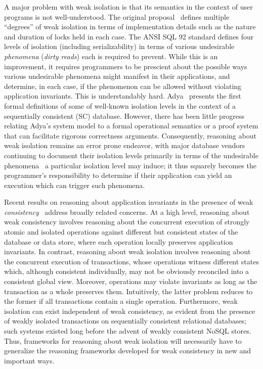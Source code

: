 A major problem with weak isolation is that its semantics in the
context of user programs is not well-understood. The original
proposal~\cite{gray1976} defines multiple ``degrees'' of weak
isolation in terms of implementation details such as the nature and
duration of locks held in each case. The ANSI SQL 92 standard defines
four levels of isolation (including serializability) in terms of
various undesirable \emph{phenomena} (\eg \emph{dirty reads}) each is
required to prevent. While this is an improvement, it requires
programmers to be prescient about the possible ways various
undesirable phenomena might manifest in their applications, and
determine, in each case, if the phenomenon can be allowed without
violating application invariants. This is understandably
hard. Adya~\cite{adyaphd} presents the first formal definitions of
some of well-known isolation levels in the context of a sequentially
consistent (SC) database.  However, there has been little progress
relating Adya's system model to a formal operational semantics or a
proof system that can facilitate rigorous correctness arguments.
Consequently, reasoning about weak isolation remains an error prone
endeavor, with major database vendors continuing to document their
isolation levels primarily in terms of the undesirable
phenomena~\cite{postgresiso, mysqliso, oracleiso} a particular
isolation level may induce; it thus squarely becomes the programmer's
responsibility to determine if their application can yield an
execution which can trigger such phenomena.

Recent results on reasoning about application invariants in the
presence of weak \emph{consistency}~\cite{burckhardt14, redblueosdi,
  redblueatc, ecinec, gotsmanpopl16} address broadly related concerns.
At a high level, reasoning about weak consistency involves reasoning
about the concurrent execution of strongly atomic and isolated
operations against different but consistent states of the database or
data store, where each operation locally preserves application
invariants. In contrast, reasoning about weak isolation involves
reasoning about the concurrent execution of transactions, whose
operations witness different states which, although consistent
individually, may not be obviously reconciled into a consistent global
view.  Moreover, operations may violate invariants as long as the
transaction as a whole preserves them.  Intuitively, the latter
problem reduces to the former if all transactions contain a single
operation. Furthermore, weak isolation can exist independent of weak
consistency, as evident from the presence of weakly isolated
transactions on sequentially consistent relational databases; such
systems existed long before the advent of weakly consistent NoSQL
stores.  Thus, frameworks for reasoning about weak isolation will
necessarily have to generalize the reasoning frameworks developed for
weak consistency in new and important ways.

